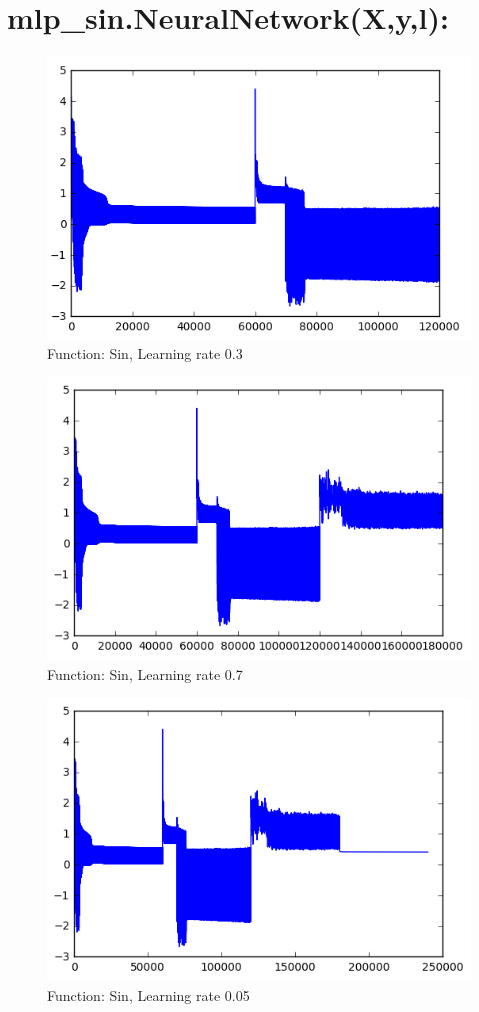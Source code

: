 \documentclass[11pt]{article}
\begin{document}
\section*{mlp\_sin.NeuralNetwork(X,y,l):}
\begin{figure}[H]
	\centering
	\includegraphics[width=0.7\linewidth]{sin_lr03}
	\caption{Function: Sin, Learning rate 0.3}
	\label{fig:sinlr03}
\end{figure}
\begin{figure}[H]
	\centering
	\includegraphics[width=0.7\linewidth]{sin_lr07}
	\caption{Function: Sin, Learning rate 0.7}
	\label{fig:sinlr07}
\end{figure}
\begin{figure}[H]
	\centering
	\includegraphics[width=0.7\linewidth]{sin_lr005}
	\caption{Function: Sin, Learning rate 0.05}
	\label{fig:sinlr005}
\end{figure}
\end{document}
